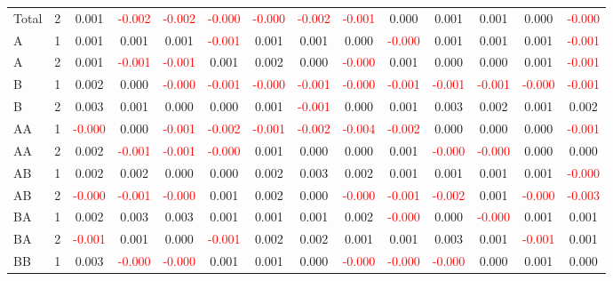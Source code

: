 \begin{table}[!htb]
{\begin{tabular}{llcccccccccccc}
Total & 2 & 0.001 & \textcolor{red}{-0.002} & \textcolor{red}{-0.002} & \textcolor{red}{-0.000} & \textcolor{red}{-0.000} & \textcolor{red}{-0.002} & \textcolor{red}{-0.001} & 0.000 & 0.001 & 0.001 & 0.000 & \textcolor{red}{-0.000}\\
A & 1 & 0.001 & 0.001 & 0.001 & \textcolor{red}{-0.001} & 0.001 & 0.001 & 0.000 & \textcolor{red}{-0.000} & 0.001 & 0.001 & 0.001 & \textcolor{red}{-0.001}\\
A & 2 & 0.001 & \textcolor{red}{-0.001} & \textcolor{red}{-0.001} & 0.001 & 0.002 & 0.000 & \textcolor{red}{-0.000} & 0.001 & 0.000 & 0.000 & 0.001 & \textcolor{red}{-0.001}\\
B & 1 & 0.002 & 0.000 & \textcolor{red}{-0.000} & \textcolor{red}{-0.001} & \textcolor{red}{-0.000} & \textcolor{red}{-0.001} & \textcolor{red}{-0.000} & \textcolor{red}{-0.001} & \textcolor{red}{-0.001} & \textcolor{red}{-0.001} & \textcolor{red}{-0.000} & \textcolor{red}{-0.001}\\
B & 2 & 0.003 & 0.001 & 0.000 & 0.000 & 0.001 & \textcolor{red}{-0.001} & 0.000 & 0.001 & 0.003 & 0.002 & 0.001 & 0.002\\
AA & 1 & \textcolor{red}{-0.000} & 0.000 & \textcolor{red}{-0.001} & \textcolor{red}{-0.002} & \textcolor{red}{-0.001} & \textcolor{red}{-0.002} & \textcolor{red}{-0.004} & \textcolor{red}{-0.002} & 0.000 & 0.000 & 0.000 & \textcolor{red}{-0.001}\\
AA & 2 & 0.002 & \textcolor{red}{-0.001} & \textcolor{red}{-0.001} & \textcolor{red}{-0.000} & 0.001 & 0.000 & 0.000 & 0.001 & \textcolor{red}{-0.000} & \textcolor{red}{-0.000} & 0.000 & 0.000\\
AB & 1 & 0.002 & 0.002 & 0.000 & 0.000 & 0.002 & 0.003 & 0.002 & 0.001 & 0.001 & 0.001 & 0.001 & \textcolor{red}{-0.000}\\
AB & 2 & \textcolor{red}{-0.000} & \textcolor{red}{-0.001} & \textcolor{red}{-0.000} & 0.001 & 0.002 & 0.000 & \textcolor{red}{-0.000} & \textcolor{red}{-0.001} & \textcolor{red}{-0.002} & 0.001 & \textcolor{red}{-0.000} & \textcolor{red}{-0.003}\\
BA & 1 & 0.002 & 0.003 & 0.003 & 0.001 & 0.001 & 0.001 & 0.002 & \textcolor{red}{-0.000} & 0.000 & \textcolor{red}{-0.000} & 0.001 & 0.001\\
BA & 2 & \textcolor{red}{-0.001} & 0.001 & 0.000 & \textcolor{red}{-0.001} & 0.002 & 0.002 & 0.001 & 0.001 & 0.003 & 0.001 & \textcolor{red}{-0.001} & 0.001\\
BB & 1 & 0.003 & \textcolor{red}{-0.000} & \textcolor{red}{-0.000} & 0.001 & 0.001 & 0.000 & \textcolor{red}{-0.000} & \textcolor{red}{-0.000} & \textcolor{red}{-0.000} & 0.000 & 0.001 & 0.000\\

\end{tabular}}
\end{table}
